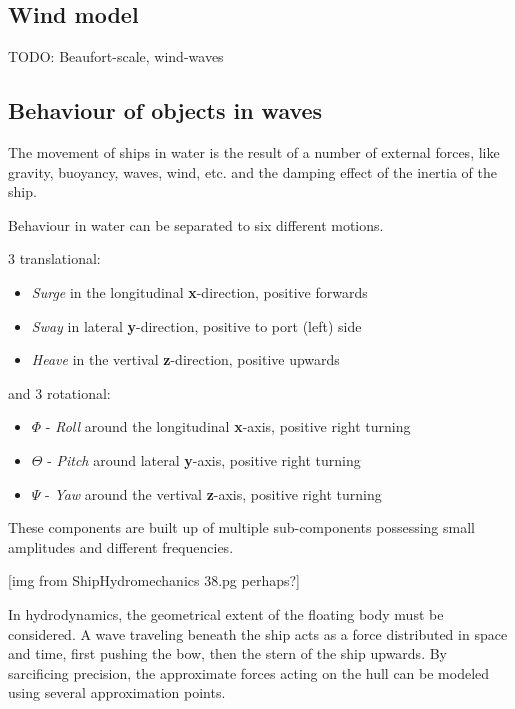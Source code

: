 \subsection{Wind model}

TODO: Beaufort-scale, wind-waves

\subsection{Behaviour of objects in waves}

The movement of ships in water is the result of a number of external forces, like gravity, buoyancy, waves, wind, etc. and the damping effect of the inertia of the ship.

Behaviour in water can be separated to six different motions.

3 translational:

\begin{itemize}

	\item \emph{Surge} in the longitudinal \textbf{x}-direction, positive forwards
	\item \emph{Sway} in lateral \textbf{y}-direction, positive to port (left) side
	\item \emph{Heave} in the vertival \textbf{z}-direction, positive upwards

\end{itemize}

and 3 rotational:

\begin{itemize}

	\item $\Phi$ - \emph{Roll} around the longitudinal \textbf{x}-axis, positive right turning
	\item $\Theta$ - \emph{Pitch} around lateral \textbf{y}-axis, positive right turning
	\item $\Psi$ - \emph{Yaw} around the vertival \textbf{z}-axis, positive right turning

\end{itemize}

These components are built up of multiple sub-components possessing small amplitudes and different frequencies.

[img from ShipHydromechanics 38.pg perhaps?]

In hydrodynamics, the geometrical extent of the floating body must be considered. A wave traveling beneath the ship acts as a force distributed in space and time, first pushing the bow, then the stern of the ship upwards. By sarcificing precision, the approximate forces acting on the hull can be modeled using several approximation points.


